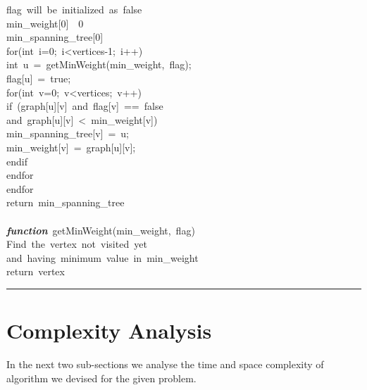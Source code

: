 \documentclass[conference]{IEEEtran}
\begin{document}
\hspace*{7mm}flag\ will\ be\ initialized\ as\ false\\
\hspace*{7mm}min\_weight[0]\ \leftarrow\ 0\\
\hspace*{7mm}min\_spanning\_tree[0]\ \\
\hspace*{7mm}for(int\ i=0;\ i<vertices-1;\ i++)\\
\hspace*{10mm}int\ u\ =\ getMinWeight(min\_weight,\ flag);\\
\hspace*{10mm}flag[u]\ =\ true;\\
\hspace*{10mm}for(int\ v=0;\ v<vertices;\ v++)\\
\hspace*{13mm}if\ (graph[u][v]\ and\ flag[v]\ ==\ false\\
\hspace*{17mm}and\ graph[u][v]\ <\ min\_weight[v])\\
\hspace*{16mm}min\_spanning\_tree[v]\ =\ u;\\
\hspace*{16mm}min\_weight[v]\ =\ graph[u][v];\\
\hspace*{13mm}endif\\
\hspace*{10mm}endfor\\
\hspace*{7mm}endfor\\
\hspace*{7mm}return\ min\_spanning\_tree\\
\\
\hspace*{4mm}\textbf{\textit{function}}\ getMinWeight(min\_weight,\ flag)\\
\hspace*{7mm}Find\ the\ vertex\ not\ visited\ yet\\
\hspace*{7mm}and\ having\ minimum\ value\ in\ min\_weight\\
\hspace*{7mm}return\ vertex\\
\vspace{5pt}
\hrule height 0.4pt depth 1pt width 250pt \relax
\vspace{5pt}
\section{Complexity Analysis}
In the next two sub-sections we analyse the time and space complexity of algorithm we devised for the given problem.
\end{document}
